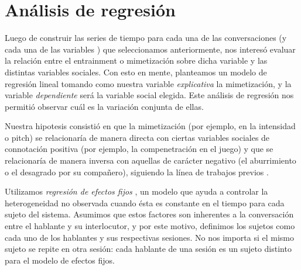 \section{Análisis de regresión}

Luego de construir las series de tiempo para cada una de las conversaciones (y cada una de las variables \ap) que seleccionamos anteriormente, nos interesó evaluar la relación entre el entrainment o mimetización sobre dicha variable y las distintas variables sociales. Con esto en mente, planteamos un modelo de regresión lineal tomando como nuestra variable \emph{explicativa} la mimetización, y la variable \emph{dependiente} será la variable social elegida. Este análisis de regresión nos permitió observar cuál es la variación conjunta de ellas.

Nuestra hipotesis consistió en que la mimetización (por ejemplo, en la intensidad o pitch) se relacionaría de manera directa con ciertas variables sociales de connotación positiva (por ejemplo, la compenetración en el juego) y que se relacionaría de manera inversa con aquellas de carácter negativo (el aburrimiento o el desagrado por su compañero), siguiendo la línea de trabajos previos \cite{gravano2015backward}.

Utilizamos \emph{regresión de efectos fijos} \cite[chap 16]{gujarati1999}, un modelo que ayuda a controlar la heterogeneidad no observada cuando ésta es constante en el tiempo para cada sujeto del sistema. Asumimos que estos factores son inherentes a la conversación entre el hablante y su interlocutor, y por este motivo, definimos los sujetos como cada uno de los hablantes y sus respectivas sesiones. No nos importa si el mismo sujeto se repite en otra sesión: cada hablante de una sesión es un sujeto distinto para el modelo de efectos fijos.
